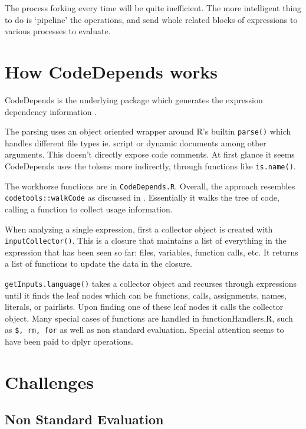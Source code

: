 \documentclass[12pt]{article}
\begin{document}
The process forking every time will be quite inefficient. The more intelligent
thing to do is `pipeline' the operations, and send whole related blocks of
expressions to various processes to evaluate.

\section{How CodeDepends works}

CodeDepends is the underlying package which generates the expression
dependency information \cite{R-CodeDepends}.

The parsing uses an object oriented wrapper around R's builtin \texttt{parse()}
which handles different file types ie. script or dynamic documents among other arguments.
This doesn't directly expose code comments.
At first glance it seems CodeDepends uses the tokens
more indirectly, through functions like \texttt{is.name()}. 

The workhorse functions are in \texttt{CodeDepends.R}. Overall, the
approach resembles \texttt{codetools::walkCode} as discussed in
\cite{chambers2016extending}. Essentially it walks the tree of code, calling
a function to collect usage information.

When analyzing a single expression, first a 
collector object is created with \texttt{inputCollector()}. This is a
closure that maintains a list of everything in the expression that has been seen
so far: files, variables, function calls, etc. It returns a list of
functions to update the data in the closure.

\texttt{getInputs.language()} takes a collector object and
recurses through expressions until it finds the leaf nodes which can be functions, calls, assignments,
names, literals, or pairlists. Upon finding one of these leaf nodes it
calls the collector object. 
Many special cases of functions are handled in functionHandlers.R, such as
\texttt{\$, rm, for} as well as non standard evaluation. Special attention seems
to have been paid to dplyr operations.

\section{Challenges}

\subsection{Non Standard Evaluation}
\end{document}
